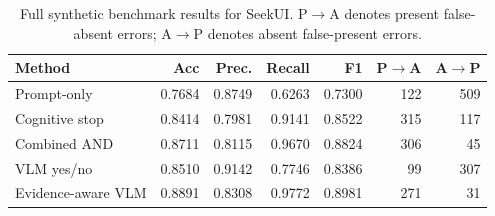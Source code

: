 \begin{table}[t]
\centering
\small
\begin{tabular}{lrrrrrr}
\toprule
Method & Acc & Prec. & Recall & F1 & P$\rightarrow$A & A$\rightarrow$P \\
\midrule
Prompt-only & 0.7684 & 0.8749 & 0.6263 & 0.7300 & 122 & 509 \\
Cognitive stop & 0.8414 & 0.7981 & 0.9141 & 0.8522 & 315 & 117 \\
Combined AND & 0.8711 & 0.8115 & 0.9670 & 0.8824 & 306 & 45 \\
VLM yes/no & 0.8510 & 0.9142 & 0.7746 & 0.8386 & 99 & 307 \\
Evidence-aware VLM & 0.8891 & 0.8308 & 0.9772 & 0.8981 & 271 & 31 \\
\bottomrule
\end{tabular}
\caption{Full synthetic benchmark results for SeekUI. P$\rightarrow$A denotes present false-absent errors; A$\rightarrow$P denotes absent false-present errors.}
\label{tab:main_results}
\end{table}
